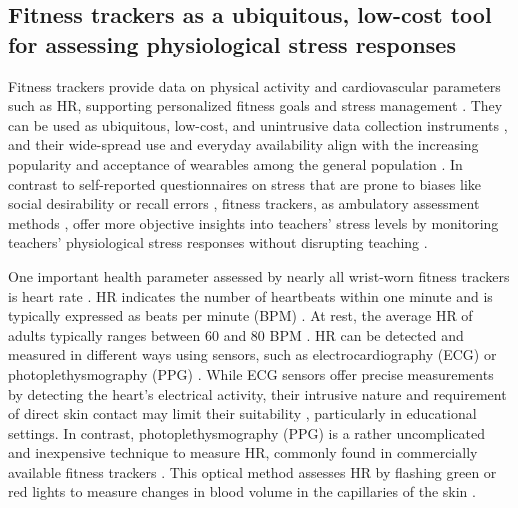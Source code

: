 \documentclass[preprint, 3p,
authoryear]{elsarticle} %
\begin{document}
\subsection{Fitness trackers as a ubiquitous, low-cost tool for
assessing physiological stress
responses}\label{fitness-trackers-as-a-ubiquitous-low-cost-tool-for-assessing-physiological-stress-responses}

Fitness trackers provide data on physical activity and cardiovascular
parameters such as HR, supporting personalized fitness goals
\citep{nuss2021effects} and stress management \citep{hao2018chrv}. They
can be used as ubiquitous, low-cost, and unintrusive data collection
instruments \citep{godfrey2018z}, and their wide-spread use and everyday
availability align with the increasing popularity and acceptance of
wearables among the general population \citep{peng2022acceptance}. In
contrast to self-reported questionnaires on stress
\citep{chaplain2008, liu2020} that are prone to biases like social
desirability \citep{razavi2001self} or recall errors
\citep{van2016accuracy}, fitness trackers, as ambulatory assessment
methods \citep{trull2013ambulatory, wettstein2020ambulatory}, offer more
objective insights into teachers' stress levels by monitoring teachers'
physiological stress responses without disrupting teaching
\citep{donker2018, runge2020}.

One important health parameter assessed by nearly all wrist-worn fitness
trackers is heart rate \citep{scalise2018wearables}. HR indicates the
number of heartbeats within one minute and is typically expressed as
beats per minute (BPM)
\citep{berntson2007cardiovascular, hottenrott2007}. At rest, the average
HR of adults typically ranges between 60 and 80 BPM
\citep{sammito2015guideline}. HR can be detected and measured in
different ways using sensors, such as electrocardiography (ECG) or
photoplethysmography (PPG) \citep{mukhopadhyay2017wearable}. While ECG
sensors offer precise measurements by detecting the heart's electrical
activity, their intrusive nature and requirement of direct skin contact
may limit their suitability \citep{kranjec2014non}, particularly in
educational settings. In contrast, photoplethysmography (PPG) is a
rather uncomplicated and inexpensive technique to measure HR, commonly
found in commercially available fitness trackers
\citep{castaneda2018review}. This optical method assesses HR by flashing
green or red lights to measure changes in blood volume in the
capillaries of the skin \citep{allen2007photoplethysmography}.
\end{document}
